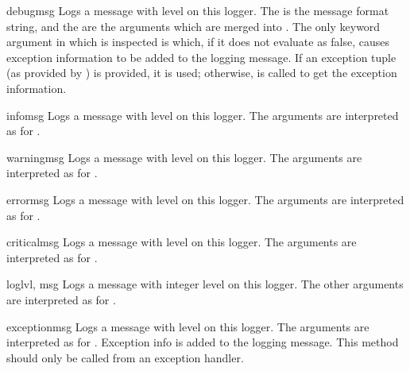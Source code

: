 \begin{methoddesc}{debug}{msg}
Logs a message with level  on this logger.
The  is the message format string, and the  are the
arguments which are merged into . The only keyword argument in
 which is inspected is  which, if it does not
evaluate as false, causes exception information to be added to the logging
message. If an exception tuple (as provided by )
is provided, it is used; otherwise,  is called
to get the exception information.
\end{methoddesc}

\begin{methoddesc}{info}{msg}
Logs a message with level  on this logger.
The arguments are interpreted as for .
\end{methoddesc}

\begin{methoddesc}{warning}{msg}
Logs a message with level  on this logger.
The arguments are interpreted as for .
\end{methoddesc}

\begin{methoddesc}{error}{msg}
Logs a message with level  on this logger.
The arguments are interpreted as for .
\end{methoddesc}

\begin{methoddesc}{critical}{msg}
Logs a message with level  on this logger.
The arguments are interpreted as for .
\end{methoddesc}

\begin{methoddesc}{log}{lvl, msg}
Logs a message with integer level  on this logger.
The other arguments are interpreted as for .
\end{methoddesc}

\begin{methoddesc}{exception}{msg}
Logs a message with level  on this logger.
The arguments are interpreted as for . Exception info
is added to the logging message. This method should only be called
from an exception handler.
\end{methoddesc}

